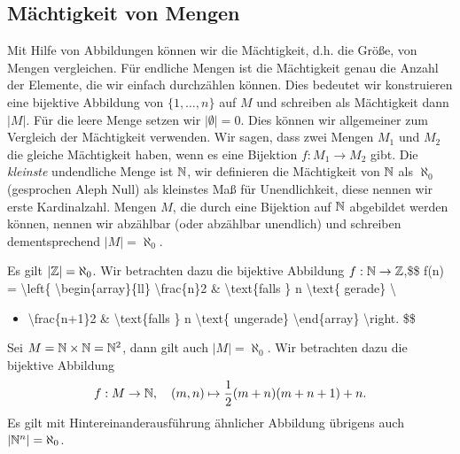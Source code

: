 \subsection{Mächtigkeit von Mengen}
\label{\detokenize{grundlagen/mengenlogik:machtigkeit-von-mengen}}
Mit Hilfe von Abbildungen können wir die Mächtigkeit, d.h. die Größe, von Mengen vergleichen. Für endliche Mengen ist die Mächtigkeit genau die Anzahl der Elemente, die wir einfach durchzählen können. Dies bedeutet wir konstruieren eine bijektive Abbildung von \(\{1,\ldots,n\}\) auf \(M\) und schreiben als Mächtigkeit dann \(\vert M \vert\). Für die leere Menge setzen wir \(\vert \emptyset \vert =0\). Dies können wir allgemeiner zum Vergleich der Mächtigkeit verwenden. Wir sagen, dass zwei Mengen \(M_1\) und \(M_2\) die gleiche Mächtigkeit haben, wenn es eine Bijektion \(f: M_1 \rightarrow M_2\) gibt.
Die \emph{kleinste} undendliche Menge ist \(\mathbb{N}\), wir definieren die Mächtigkeit von \(\mathbb{N}\) als \(\aleph_0\) (gesprochen Aleph Null) als kleinstes Maß für Unendlichkeit, diese nennen wir erste Kardinalzahl. Mengen \(M\), die durch eine Bijektion auf \(\mathbb{N}\) abgebildet werden können, nennen wir abzählbar (oder abzählbar unendlich) und schreiben dementsprechend \(|M|=\aleph_0\).
\label{grundlagen/mengenlogik:example-12}
\begin{example}{}{}



Es gilt \(|\mathbb{Z}|=\aleph_0\). Wir betrachten dazu die bijektive Abbildung \(f: \mathbb{N} \rightarrow \mathbb{Z}\),\$\$ f(n) = \textbackslash{}left\{ \textbackslash{}begin\{array\}\{ll\} \textbackslash{}frac\{n\}2 \& \textbackslash{}text\{falls \} n \textbackslash{}text\{ gerade\} \textbackslash{}
\begin{itemize}
\item {} 
\textbackslash{}frac\{n+1\}2 \& \textbackslash{}text\{falls \} n \textbackslash{}text\{ ungerade\} \textbackslash{}end\{array\} \textbackslash{}right. \$\$

\end{itemize}
\end{example}
\label{grundlagen/mengenlogik:example-13}
\begin{example}{}{}



Sei \(M= \mathbb{N} \times \mathbb{N} = \mathbb{N}^2\), dann gilt auch \(|M|=\aleph_0\). Wir betrachten dazu die bijektive Abbildung
\begin{equation*}
f: M \rightarrow \mathbb{N}, \quad (m,n) \mapsto \frac{1}2(m+n)(m+n+1) + n.
\end{equation*}
Es gilt mit Hintereinanderausführung ähnlicher Abbildung übrigens auch \(|\mathbb{N}^n|=\aleph_0\).
\end{example}


